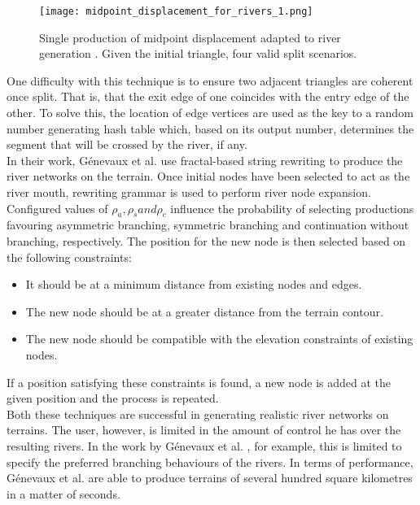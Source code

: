 \begin{figure}[h]
  \centering
	\label{Single production of midpoint displacement adapted to river generation. Given the initial triangle, four valid split scenarios. }
	\texttt{[image: midpoint\_displacement\_for\_rivers\_1.png]}
	\caption{Single production of midpoint displacement adapted to river generation \cite{Prusinkiewicz1993}. Given the initial triangle, four valid split scenarios.}
\end{figure}

One difficulty with this technique is to ensure two adjacent triangles are coherent once split. That is, that the exit edge of one coincides with the entry edge of the other. To solve this, the location of edge vertices are used as the key to a random number generating hash table which, based on its output number, determines the segment that will be crossed by the river, if any.  \\

In their work, Génevaux et al. \cite{Genevaux2013} use fractal-based string rewriting to produce the river networks on the terrain. Once initial nodes have been selected to act as the river mouth, rewriting grammar is used to perform river node expansion. Configured values of $\rho_{a}, \rho_{s} and \rho_{c}$ influence the probability of selecting productions favouring asymmetric branching, symmetric branching and continuation without branching, respectively. The position for the new node is then selected based on the following constraints:
\begin{itemize}
\item It should be at a minimum distance from existing nodes and edges.
\item The new node should be at a greater distance from the terrain contour.
\item The new node should be compatible with the elevation constraints of existing nodes.
\end{itemize}
If a position satisfying these constraints is found, a new node is added at the given position and the process is repeated.\\

Both these techniques are successful in generating realistic river networks on terrains. The user, however, is limited in the amount of control he has over the resulting rivers. In the work by Génevaux et al. \cite{Genevaux2013}, for example, this is limited to specify the preferred branching behaviours of the rivers. In terms of performance, Génevaux et al. \cite{Genevaux2013} are able to produce terrains of several hundred square kilometres in a matter of seconds.

